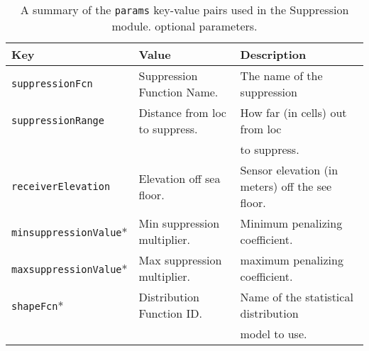 \begin{table}[ht]
	\begin{tabular}{l l l}
		Key									&	Value 							&	Description\\
		\hline
		\texttt{suppressionFcn}				& 	Suppression Function Name.		&	The name of the suppression \\

		\texttt{suppressionRange}			&	Distance from loc to suppress.	&	How far (in cells) out from loc\\
											&									&   to suppress.\\
		\texttt{receiverElevation}			& 	Elevation off sea floor.		&   Sensor elevation (in meters) off the see floor.\\
		\texttt{minsuppressionValue}*		& 	Min suppression multiplier.		&	Minimum penalizing coefficient.\\
		\texttt{maxsuppressionValue}*		& 	Max suppression multiplier.		&	maximum penalizing coefficient.\\
		\texttt{shapeFcn}*					&   Distribution Function ID. 		&   Name of the statistical distribution\\
											&									&   model to use.\\
	\end{tabular}
	\caption{A summary of the \texttt{params} key-value pairs used in the Suppression module.  \newline * optional parameters.
		\label{animalParams}}
\end{table}

